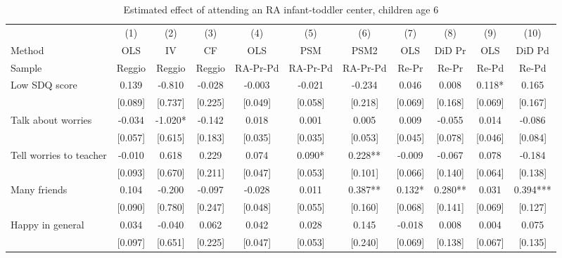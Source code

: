 \documentclass[12pt]{article}
\begin{document}
\begin{table}[ht]
\caption{Estimated effect of attending an RA infant-toddler center, children age 6}

\label{tab:childIT}
\begin{center}
\begin{adjustbox}{width=1.2\textwidth,center=\textwidth}
\small
\begin{tabular}{l*{10}{c}}
\hline\hline
& (1) & (2) & (3) & (4) & (5) & (6) & (7) & (8) & (9) & (10) \\ 
Method & OLS & IV & CF & OLS & PSM & PSM2 & OLS & DiD Pr & OLS & DiD Pd \\
Sample & Reggio & Reggio & Reggio & RA-Pr-Pd & RA-Pr-Pd & RA-Pr-Pd & Re-Pr & Re-Pr & Re-Pd & Re-Pd \\
\hline
Low SDQ score  & 0.139 & -0.810 & -0.028 & -0.003 & -0.021 & -0.234 & 0.046 & 0.008 & 0.118* & 0.165 \\
 & [0.089] & [0.737] & [0.225] & [0.049] & [0.058] & [0.218] & [0.069] & [0.168] & [0.069] & [0.167] \\
Talk about worries  & -0.034 & -1.020* & -0.142 & 0.018 & 0.001 & 0.005 & 0.009 & -0.055 & 0.014 & -0.086 \\
 & [0.057] & [0.615] & [0.183] & [0.035] & [0.035] & [0.053] & [0.045] & [0.078] & [0.046] & [0.084] \\
Tell worries to teacher & -0.010 & 0.618 & 0.229 & 0.074 & 0.090* & 0.228** & -0.009 & -0.067 & 0.078 & -0.184 \\
 & [0.093] & [0.670] & [0.211] & [0.047] & [0.053] & [0.101] & [0.066] & [0.140] & [0.064] & [0.138] \\
Many friends  & 0.104 & -0.200 & -0.097 & -0.028 & 0.011 & 0.387** & 0.132* & 0.280** & 0.031 & 0.394*** \\
 & [0.090] & [0.780] & [0.247] & [0.048] & [0.055] & [0.160] & [0.068] & [0.141] & [0.069] & [0.127] \\
Happy in general & 0.034 & -0.040 & 0.062 & 0.042 & 0.028 & 0.145 & -0.018 & 0.008 & 0.004 & 0.075 \\
 & [0.097] & [0.651] & [0.225] & [0.047] & [0.053] & [0.240] & [0.069] & [0.138] & [0.067] & [0.135] \\

\end{tabular}
\end{adjustbox}
\end{center}
\end{table}
\end{document}
